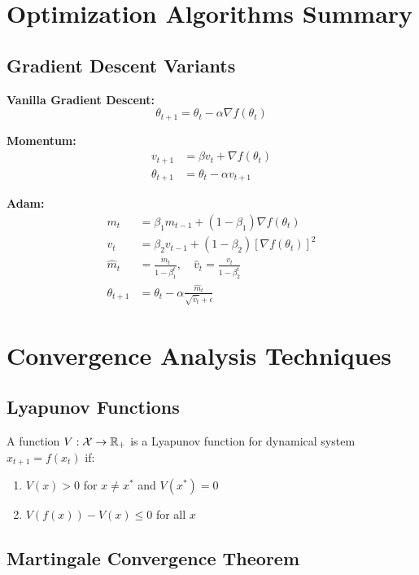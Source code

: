 \section{Optimization Algorithms Summary}

\subsection{Gradient Descent Variants}

\textbf{Vanilla Gradient Descent:}
\begin{equation}
\theta_{t+1} = \theta_t - \alpha \nabla f(\theta_t)
\end{equation}

\textbf{Momentum:}
\begin{align}
v_{t+1} &= \beta v_t + \nabla f(\theta_t) \\
\theta_{t+1} &= \theta_t - \alpha v_{t+1}
\end{align}

\textbf{Adam:}
\begin{align}
m_t &= \beta_1 m_{t-1} + (1-\beta_1) \nabla f(\theta_t) \\
v_t &= \beta_2 v_{t-1} + (1-\beta_2) [\nabla f(\theta_t)]^2 \\
\hat{m}_t &= \frac{m_t}{1-\beta_1^t}, \quad \hat{v}_t = \frac{v_t}{1-\beta_2^t} \\
\theta_{t+1} &= \theta_t - \alpha \frac{\hat{m}_t}{\sqrt{\hat{v}_t} + \epsilon}
\end{align}

\section{Convergence Analysis Techniques}

\subsection{Lyapunov Functions}

A function $V: \mathcal{X} \to \mathbb{R}_+$ is a Lyapunov function for dynamical system $x_{t+1} = f(x_t)$ if:
\begin{enumerate}
    \item $V(x) > 0$ for $x \neq x^*$ and $V(x^*) = 0$
    \item $V(f(x)) - V(x) \leq 0$ for all $x$
\end{enumerate}

\subsection{Martingale Convergence Theorem}


